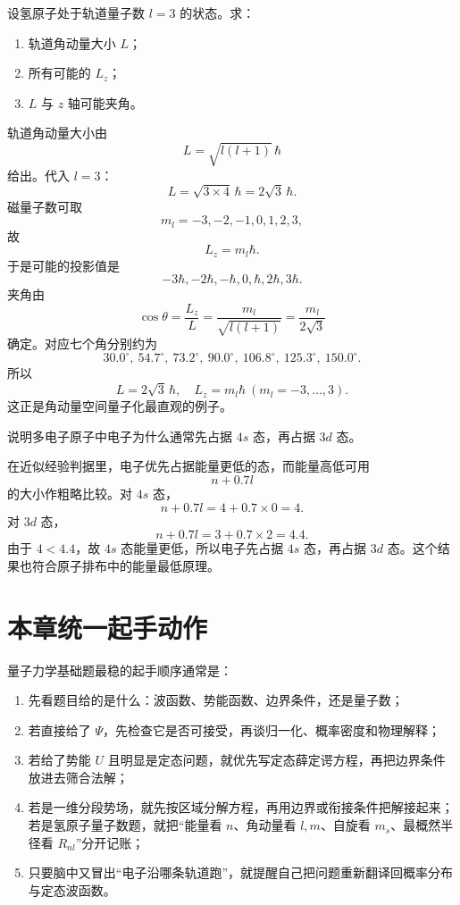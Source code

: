 \documentclass[lang=cn,11pt]{elegantbook}
\begin{document}
\begin{example}[氢原子 \(l=3\) 态的角动量、投影与夹角]
设氢原子处于轨道量子数 \(l=3\) 的状态。求：
\begin{enumerate}
  \item 轨道角动量大小 \(L\)；
  \item 所有可能的 \(L_z\)；
  \item \(L\) 与 \(z\) 轴可能夹角。
\end{enumerate}
\end{example}

\begin{solution}
轨道角动量大小由
\[
L=\sqrt{l(l+1)}\,\hbar
\]
给出。代入 \(l=3\)：
\[
L=\sqrt{3\times 4}\,\hbar=2\sqrt3\,\hbar.
\]
磁量子数可取
\[
m_l=-3,-2,-1,0,1,2,3,
\]
故
\[
L_z=m_l\hbar.
\]
于是可能的投影值是
\[
-3\hbar,-2\hbar,-\hbar,0,\hbar,2\hbar,3\hbar.
\]
夹角由
\[
\cos\theta=\frac{L_z}{L}
=\frac{m_l}{\sqrt{l(l+1)}}=\frac{m_l}{2\sqrt3}
\]
确定。对应七个角分别约为
\[
30.0^\circ,\ 54.7^\circ,\ 73.2^\circ,\ 90.0^\circ,\ 106.8^\circ,\ 125.3^\circ,\ 150.0^\circ.
\]
所以
\[
\boxed{L=2\sqrt3\,\hbar,\quad L_z=m_l\hbar\ (m_l=-3,\dots,3).}
\]
这正是角动量空间量子化最直观的例子。
\end{solution}

\begin{example}[为什么先填 \(4s\) 再填 \(3d\)]
说明多电子原子中电子为什么通常先占据 \(4s\) 态，再占据 \(3d\) 态。
\end{example}

\begin{solution}
在近似经验判据里，电子优先占据能量更低的态，而能量高低可用
\[
n+0.7l
\]
的大小作粗略比较。对 \(4s\) 态，
\[
n+0.7l=4+0.7\times 0=4.
\]
对 \(3d\) 态，
\[
n+0.7l=3+0.7\times 2=4.4.
\]
由于 \(4<4.4\)，故 \(4s\) 态能量更低，所以电子先占据 \(4s\) 态，再占据 \(3d\) 态。这个结果也符合原子排布中的能量最低原理。
\end{solution}

\section{本章统一起手动作}

量子力学基础题最稳的起手顺序通常是：
\begin{enumerate}
  \item 先看题目给的是什么：波函数、势能函数、边界条件，还是量子数；
  \item 若直接给了 \(\Psi\)，先检查它是否可接受，再谈归一化、概率密度和物理解释；
  \item 若给了势能 \(U\) 且明显是定态问题，就优先写定态薛定谔方程，再把边界条件放进去筛合法解；
  \item 若是一维分段势场，就先按区域分解方程，再用边界或衔接条件把解接起来；若是氢原子量子数题，就把“能量看 \(n\)、角动量看 \(l,m\)、自旋看 \(m_s\)、最概然半径看 \(R_{nl}\)”分开记账；
  \item 只要脑中又冒出“电子沿哪条轨道跑”，就提醒自己把问题重新翻译回概率分布与定态波函数。
\end{enumerate}
\end{document}
